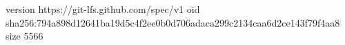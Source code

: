 version https://git-lfs.github.com/spec/v1
oid sha256:794a898d12641ba19d5c4f2ee0b0d706adaca299c2134caa6d2ce143f79f4aa8
size 5566

